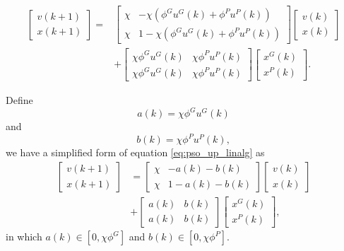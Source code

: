 \begin{equation}
\label{eq:pso_up_linalg}
\begin{aligned}
\begin{bmatrix}
v(k+1)
\\ 
x(k+1)
\end{bmatrix}
= &
\begin{bmatrix}
\chi & - \chi (\phi^{G} u^{G}(k) + \phi^{P} u^{P}(k) )
\\ 
\chi & 1 - \chi (\phi^{G} u^{G}(k) + \phi^{P} u^{P}(k) )
\end{bmatrix}
\begin{bmatrix}
v(k)
\\ 
x(k)
\end{bmatrix}
\\ & +  
\begin{bmatrix}
\chi \phi^{G} u^{G}(k) & \chi \phi^{P} u^{P}(k)
\\ 
\chi \phi^{G} u^{G}(k) & \chi \phi^{P} u^{P}(k)
\end{bmatrix}
\begin{bmatrix}
x^{G}(k)
\\ 
x^{P}(k)
\end{bmatrix}.
\end{aligned}
\end{equation}

Define
\begin{equation}
\label{eq:func_a}
a(k) = \chi \phi^{G} u^{G}(k)
\end{equation}
and
\begin{equation}
\label{eq:func_b}
b(k) = \chi \phi^{P} u^{P}(k),
\end{equation}
we have a simplified form of equation \eqref{eq:pso_up_linalg} as
\begin{equation}
\label{eq:pso_up_linalg_simp}
\begin{aligned}
\begin{bmatrix}
v(k+1)
\\ 
x(k+1)
\end{bmatrix}
& =
\begin{bmatrix}
\chi & - a(k) - b(k)
\\ 
\chi & 1 - a(k) - b(k)
\end{bmatrix}
\begin{bmatrix}
v(k)
\\ 
x(k)
\end{bmatrix}
\\
& + 
\begin{bmatrix}
a(k) & b(k)
\\ 
a(k) & b(k)
\end{bmatrix}
\begin{bmatrix}
x^{G}(k)
\\ 
x^{P}(k)
\end{bmatrix},
\end{aligned}
\end{equation}
in which
$ a(k) \in [0, \chi \phi^{G} ] $ and $ b(k) \in [0, \chi \phi^{P}] $.

